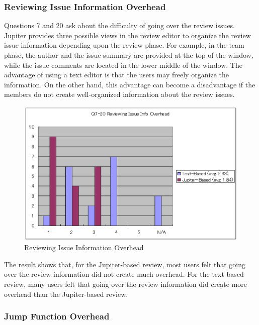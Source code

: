 \subsubsection{Reviewing Issue Information Overhead}
\label{subsubsec:reviewing-issue-information-overhead}

Questions 7 and 20 ask about the difficulty of going over the review issues. Jupiter provides three possible views in the review editor to organize the review issue information depending upon the review phase. For example, in the team phase, the author and the issue summary are provided at the top of the window, while the issue comments are located in the lower middle of the window. The advantage of using a text editor is that the users may freely organize the information. On the other hand, this advantage can become a disadvantage if the members do not create well-organized information about the review issues.

\begin{figure}[htbp]
  \centering
  \includegraphics{images/fig5-9.eps}
  \caption{Reviewing Issue Information Overhead}
  \label{fig5-9}
\end{figure}
 
The result shows that, for the Jupiter-based review, most users felt that going over the review information did not create much overhead. For the text-based review, many users felt that going over the review information did create more overhead than the Jupiter-based review.

\subsubsection{Jump Function Overhead}
\label{subsubsec:jump-function-overhead}

